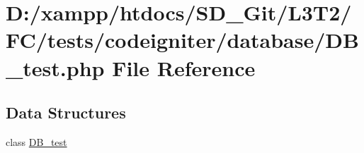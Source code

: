 \hypertarget{_d_b__test_8php}{}\section{D\+:/xampp/htdocs/\+S\+D\+\_\+\+Git/\+L3\+T2/\+F\+C/tests/codeigniter/database/\+D\+B\+\_\+test.php File Reference}
\label{_d_b__test_8php}
\subsection*{Data Structures}
\begin{DoxyCompactItemize}
\item 
class \hyperlink{class_d_b__test}{D\+B\+\_\+test}
\end{DoxyCompactItemize}
